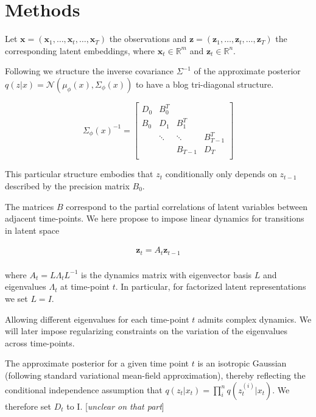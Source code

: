 \section{Methods}

Let $\mathbf{x} = (\mathbf{x}_1, \dots, \mathbf{x}_t, \dots, \mathbf{x}_T)$ the observations and $\mathbf{z} = (\mathbf{z}_1, \dots, \mathbf{z}_t, \dots, \mathbf{z}_T)$ the corresponding latent embeddings, where $\mathbf{x}_t \in \mathbb{R}^m$ and $\mathbf{z}_t \in \mathbb{R}^n$.

Following \cite{Archer2016} we structure the inverse covariance $\Sigma^{-1}$ of the approximate posterior $q(z|x) = \mathcal{N}(\mu_\phi(x), \Sigma_\phi(x))$ to have a blog tri-diagonal structure.

$$
\Sigma_\phi(x)^{-1} = \begin{bmatrix}
  D_0 & B_0^T & & \\
  B_0 & D_1 & B_1^T & \\
   & \ddots & \ddots & B^T_{T-1} \\
   & & B_{T-1} & D_T \\
\end{bmatrix}
$$

This particular structure embodies that $z_t$ conditionally only depends on $z_{t-1}$ described by the precision matrix $B_0$.

The matrices $B$ correspond to the partial correlations of latent variables between adjacent time-points. We here propose to impose linear dynamics for transitions in latent space

\begin{align*}
  \mathbf{z}_t = A_t \mathbf{z}_{t-1} \\
\end{align*}

where $A_t = L \Lambda_t L^{-1}$ is the dynamics matrix with eigenvector basis $L$ and eigenvalues $\Lambda_t$ at time-point $t$. In particular, for factorized latent representations we set $L = I$. 

Allowing different eigenvalues for each time-point $t$ admits complex dynamics. We will later impose regularizing constraints on the variation of the eigenvalues across time-points.

The approximate posterior for a given time point $t$ is an isotropic Gaussian (following standard variational mean-field approximation), thereby reflecting the conditional independence assumption that $q(z_t|x_t) = \prod_{i}^n q(z^{(i)}_t|x_t)$. We therefore set $D_t$ to I. [\textit{unclear on that part}]

